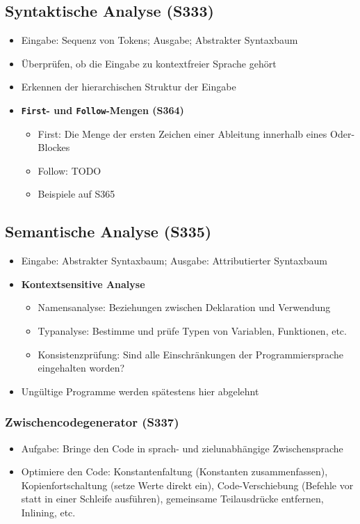 \subsection{Syntaktische Analyse (S333)}
\begin{itemize}
	\item Eingabe: Sequenz von Tokens; Ausgabe; Abstrakter Syntaxbaum
	\item Überprüfen, ob die Eingabe zu kontextfreier Sprache gehört
	\item Erkennen der hierarchischen Struktur der Eingabe
	\item \textbf{\texttt{First}- und \texttt{Follow}-Mengen (S364)}
	\begin{itemize}
		\item First: Die Menge der ersten Zeichen einer Ableitung innerhalb eines Oder-Blockes
		\item Follow: TODO
		\item Beispiele auf S365
	\end{itemize}
\end{itemize}

\subsection{Semantische Analyse (S335)}
\begin{itemize}
	\item Eingabe: Abstrakter Syntaxbaum; Ausgabe: Attributierter Syntaxbaum
	\item \textbf{Kontextsensitive Analyse}
	\begin{itemize}
		\item Namensanalyse: Beziehungen zwischen Deklaration und Verwendung
		\item Typanalyse: Bestimme und prüfe Typen von Variablen, Funktionen, etc.
		\item Konsistenzprüfung: Sind alle Einschränkungen der Programmiersprache eingehalten worden?
	\end{itemize}
	\item Ungültige Programme werden spätestens hier abgelehnt
\end{itemize}

\subsubsection{Zwischencodegenerator (S337)}
\begin{itemize}
	\item Aufgabe: Bringe den Code in sprach- und zielunabhängige Zwischensprache
	\item Optimiere den Code: Konstantenfaltung (Konstanten zusammenfassen), Kopienfortschaltung (setze Werte direkt ein), Code-Verschiebung (Befehle vor statt in einer Schleife ausführen), gemeinsame Teilausdrücke entfernen, Inlining, etc.
\end{itemize}

